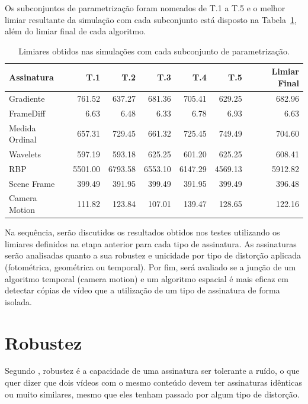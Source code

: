 Os subconjuntos de parametrização foram nomeados de T.1 a T.5 e o melhor limiar resultante da simulação com cada subconjunto está disposto na Tabela~\ref{tab:limiares}, além do limiar final de cada algoritmo.

\begin{table}[h]
	\caption{Limiares obtidos nas simulações com cada subconjunto de parametrização.}
	\label{tab:limiares}
	\begin{tabular}{|l|r|r|r|r|r|r|}
		\hline
		\textbf{Assinatura} & \textbf{T.1} & \textbf{T.2} & \textbf{T.3} & \textbf{T.4} & \textbf{T.5} & \textbf{Limiar Final}\\ \hline
		Gradiente & 761.52 & 637.27 & 681.36 & 705.41 & 629.25 & 682.96\\ \hline
		FrameDiff & 6.63 & 6.48 & 6.33 & 6.78 & 6.93 & 6.63\\ \hline
		Medida Ordinal & 657.31 & 729.45 & 661.32 & 725.45 & 749.49 & 704.60\\ \hline
		Wavelets & 597.19 & 593.18 & 625.25 & 601.20 & 625.25 & 608.41\\ \hline
		RBP & 5501.00 & 6793.58 & 6553.10 & 6147.29 & 4569.13 & 5912.82\\ \hline
		Scene Frame & 399.49 & 391.95 & 399.49 & 391.95 & 399.49 & 396.48\\ \hline
		Camera Motion & 111.82 & 123.84 & 107.01 & 139.47 & 128.65 & 122.16\\ \hline
	\end{tabular}
\end{table}

Na sequência, serão discutidos os resultados obtidos nos testes utilizando os limiares definidos na etapa anterior para cada tipo de assinatura. As assinaturas serão analisadas quanto a sua robustez e unicidade por tipo de distorção aplicada (fotométrica, geométrica ou temporal). Por fim, será avaliado se a junção de um algoritmo temporal (camera motion) e um algoritmo espacial é mais eficaz em detectar cópias de vídeo que a utilização de um tipo de assinatura de forma isolada. 

\section{Robustez}

Segundo , robustez é a capacidade de uma assinatura ser tolerante a ruído, o que quer dizer que dois vídeos com o mesmo conteúdo devem ter assinaturas idênticas ou muito similares, mesmo que eles tenham passado por algum tipo de distorção.

